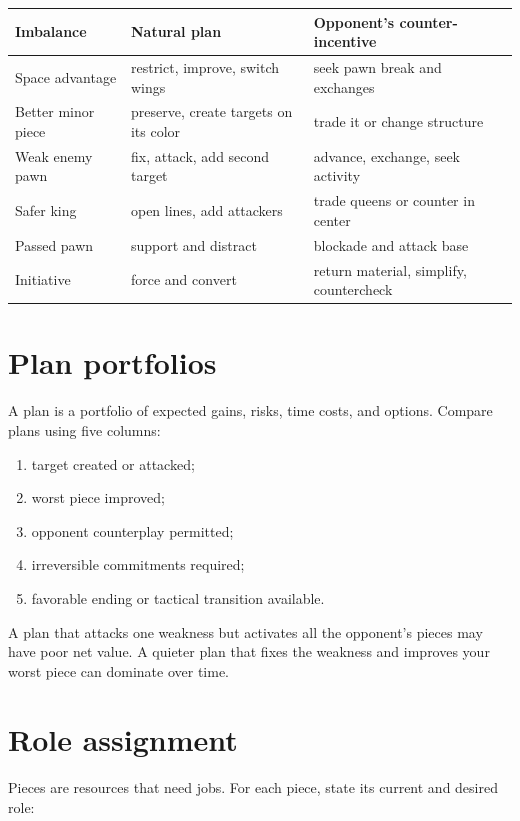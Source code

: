 \begin{center}
\begin{tabularx}{.94\textwidth}{p{}YY}
\toprule
\textbf{Imbalance} & \textbf{Natural plan} & \textbf{Opponent's counter-incentive}\\
\midrule
Space advantage & restrict, improve, switch wings & seek pawn break and exchanges\\
Better minor piece & preserve, create targets on its color & trade it or change structure\\
Weak enemy pawn & fix, attack, add second target & advance, exchange, seek activity\\
Safer king & open lines, add attackers & trade queens or counter in center\\
Passed pawn & support and distract & blockade and attack base\\
Initiative & force and convert & return material, simplify, countercheck\\
\bottomrule
\end{tabularx}
\end{center}

\section{Plan portfolios}
A plan is a portfolio of expected gains, risks, time costs, and options. Compare plans using five columns:

\begin{enumerate}[label=\textbf{\arabic*.},leftmargin=2em]
\item target created or attacked;
\item worst piece improved;
\item opponent counterplay permitted;
\item irreversible commitments required;
\item favorable ending or tactical transition available.
\end{enumerate}

A plan that attacks one weakness but activates all the opponent's pieces may have poor net value. A quieter plan that fixes the weakness and improves your worst piece can dominate over time.

\section{Role assignment}
Pieces are resources that need jobs. For each piece, state its current and desired role:

